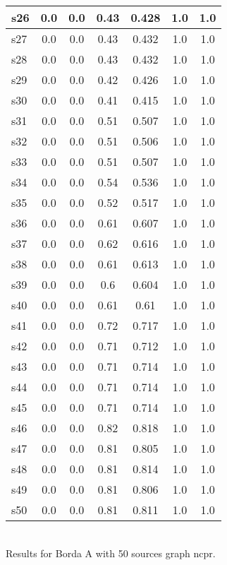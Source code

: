 \documentclass{article}
\begin{document}
\begin{tabular}{|l|c|c|c|c|c|c|}
\hline
s26 &0.0 & 0.0 & 0.43 & 0.428 & 1.0 & 1.0\\
\hline
s27 &0.0 & 0.0 & 0.43 & 0.432 & 1.0 & 1.0\\
\hline
s28 &0.0 & 0.0 & 0.43 & 0.432 & 1.0 & 1.0\\
\hline
s29 &0.0 & 0.0 & 0.42 & 0.426 & 1.0 & 1.0\\
\hline
s30 &0.0 & 0.0 & 0.41 & 0.415 & 1.0 & 1.0\\
\hline
s31 &0.0 & 0.0 & 0.51 & 0.507 & 1.0 & 1.0\\
\hline
s32 &0.0 & 0.0 & 0.51 & 0.506 & 1.0 & 1.0\\
\hline
s33 &0.0 & 0.0 & 0.51 & 0.507 & 1.0 & 1.0\\
\hline
s34 &0.0 & 0.0 & 0.54 & 0.536 & 1.0 & 1.0\\
\hline
s35 &0.0 & 0.0 & 0.52 & 0.517 & 1.0 & 1.0\\
\hline
s36 &0.0 & 0.0 & 0.61 & 0.607 & 1.0 & 1.0\\
\hline
s37 &0.0 & 0.0 & 0.62 & 0.616 & 1.0 & 1.0\\
\hline
s38 &0.0 & 0.0 & 0.61 & 0.613 & 1.0 & 1.0\\
\hline
s39 &0.0 & 0.0 & 0.6 & 0.604 & 1.0 & 1.0\\
\hline
s40 &0.0 & 0.0 & 0.61 & 0.61 & 1.0 & 1.0\\
\hline
s41 &0.0 & 0.0 & 0.72 & 0.717 & 1.0 & 1.0\\
\hline
s42 &0.0 & 0.0 & 0.71 & 0.712 & 1.0 & 1.0\\
\hline
s43 &0.0 & 0.0 & 0.71 & 0.714 & 1.0 & 1.0\\
\hline
s44 &0.0 & 0.0 & 0.71 & 0.714 & 1.0 & 1.0\\
\hline
s45 &0.0 & 0.0 & 0.71 & 0.714 & 1.0 & 1.0\\
\hline
s46 &0.0 & 0.0 & 0.82 & 0.818 & 1.0 & 1.0\\
\hline
s47 &0.0 & 0.0 & 0.81 & 0.805 & 1.0 & 1.0\\
\hline
s48 &0.0 & 0.0 & 0.81 & 0.814 & 1.0 & 1.0\\
\hline
s49 &0.0 & 0.0 & 0.81 & 0.806 & 1.0 & 1.0\\
\hline
s50 &0.0 & 0.0 & 0.81 & 0.811 & 1.0 & 1.0\\
\hline
\end{tabular}\\

\noindent Results for Borda A with 50 sources graph ncpr.
\end{document}
